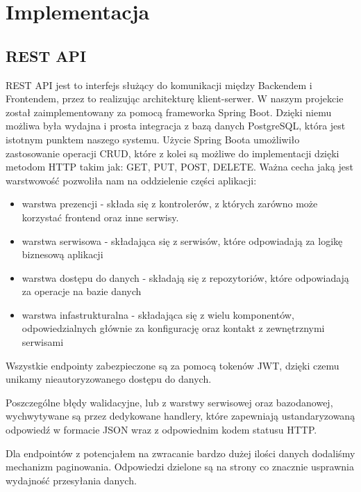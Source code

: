 
\chapter{Implementacja}

\section{REST API}
REST API jest to interfejs służący do komunikacji między Backendem i Frontendem, przez to realizując architekturę klient-serwer. W naszym projekcie został zaimplementowany 
za pomocą frameworka Spring Boot. Dzięki niemu możliwa była wydajna i prosta integracja z bazą danych PostgreSQL, która jest istotnym
punktem naszego systemu. Użycie Spring Boota umożliwiło zastosowanie operacji CRUD, które z kolei są możliwe do implementacji dzięki 
metodom HTTP takim jak: GET, PUT, POST, DELETE. Ważna cecha jaką jest warstwowość pozwoliła nam na oddzielenie części aplikacji:
\begin{itemize}
    \item warstwa prezencji - składa się z kontrolerów, z których zarówno może korzystać frontend oraz inne serwisy.
    \item warstwa serwisowa - składająca się z serwisów, które odpowiadają za logikę biznesową aplikacji
    \item warstwa dostępu do danych - składają się z repozytoriów, które odpowiadają za operacje na bazie danych
    \item warstwa infastrukturalna - składająca się z wielu komponentów, odpowiedzialnych głównie za konfigurację oraz kontakt z zewnętrznymi
    serwisami
\end{itemize}

Wszystkie endpointy zabezpieczone są za pomocą tokenów JWT, dzięki czemu unikamy nieautoryzowanego dostępu do danych. 

Poszczególne błędy walidacyjne, lub z warstwy serwisowej oraz bazodanowej, wychwytywane są przez dedykowane handlery, które zapewniają ustandaryzowaną odpowiedź w formacie JSON wraz z
odpowiednim kodem statusu HTTP. 

Dla endpointów z potencjałem na zwracanie bardzo dużej ilości danych dodaliśmy mechanizm paginowania. Odpowiedzi dzielone są na strony 
co znacznie usprawnia wydajność przesyłania danych.

